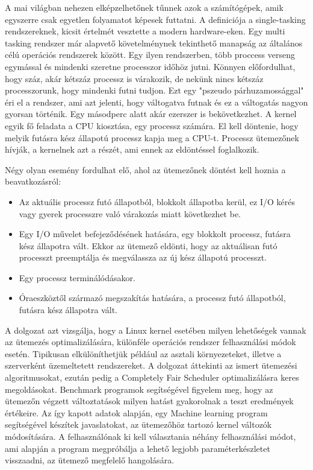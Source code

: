 
A mai világban nehezen elképzelhetőnek tűnnek azok a számítógépek, amik egyszerre csak egyetlen folyamatot képesek futtatni.
A definiciója a single-tasking rendszereknek, kicsit értelmét vesztette a modern hardware-eken. Egy multi tasking rendszer már alapvető követelménynek tekinthető manapság az általános célú operációs rendszerek között. Egy ilyen rendszerben, több proccess verseng egymással és mindenki szeretne processzor időhöz jutni. Könnyen előfordulhat, hogy száz, akár kétszáz processz is várakozik, de nekünk nincs kétszáz processzorunk, hogy mindenki futni tudjon. Ezt egy "pszeudo párhuzamossággal" éri el a rendszer, ami azt jelenti, hogy váltogatva futnak és ez a váltogatás nagyon gyorsan történik. Egy másodperc alatt akár ezerszer is bekövetkezhet.
A kernel egyik fő feladata a CPU kiosztása, egy processz számára. El kell döntenie, hogy melyik futásra kész állapotú processz kapja meg a CPU-t.
Processz ütemezőnek hívják, a kernelnek azt a részét, ami ennek az eldöntéssel foglalkozik.

Négy olyan esemény fordulhat elő, ahol az ütemezőnek döntést kell hoznia a beavatkozásról:
\begin{itemize}
  \item Az aktuális processz futó állapotból, blokkolt állapotba kerül, ez I/O kérés vagy gyerek processzre való várakozás miatt következhet be.
  \item Egy I/O művelet befejeződésének hatására, egy blokkolt processz, futásra kész állapotra vált. Ekkor az ütemező eldönti, hogy az aktuálisan futó processzt preemptálja és megválassza az új kész állapotú processzt.
  \item Egy processz terminálódásakor.
  \item Óraeszköztől származó megszakítás hatására, a processz futó állapotból, futásra kész állapotra vált. 
\end{itemize}

A dolgozat azt vizsgálja, hogy a Linux kernel esetében milyen lehetőségek vannak az ütemezés optimalizálására, különféle operációs rendszer felhasználási módok esetén. Tipikusan elkülöníthetjük például az asztali környezeteket, illetve a szerverként üzemeltetett rendszereket. A dolgozat áttekinti az ismert ütemezési algoritmusokat, ezután pedig a Completely Fair Scheduler optimalizálásra keres megoldásokat. Benchmark programok segítségével figyelem meg, hogy az ütemezőn végzett változtatások milyen hatást gyakorolnak a teszt eredmények értékeire.
Az így kapott adatok alapján, egy Machine learning program segítségével készítek javaslatokat, az ütemezőhöz tartozó kernel változók módosítására. A felhasználónak ki kell választania néhány felhasználási módot, ami alapján a program megpróbálja a lehető legjobb paraméterkészletet visszaadni, az ütemező megfelelő hangolására.

